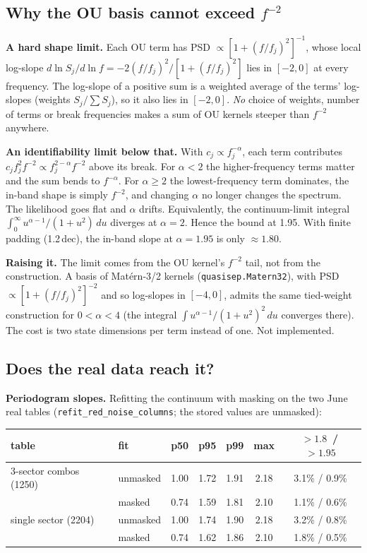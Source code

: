 \documentclass[11pt]{article}
\newcommand{\code}[1]{\texttt{#1}}
\begin{document}
\subsection{Why the OU basis cannot exceed $f^{-2}$}

\textbf{A hard shape limit.} Each OU term has PSD $\propto [1+(f/f_j)^2]^{-1}$, whose
local log-slope $d\ln S_j/d\ln f = -2(f/f_j)^2/[1+(f/f_j)^2]$ lies in $[-2, 0]$ at every
frequency. The log-slope of a positive sum is a weighted average of the terms' log-slopes
(weights $S_j/\sum S_j$), so it also lies in $[-2,0]$. \emph{No} choice of weights, number
of terms or break frequencies makes a sum of OU kernels steeper than $f^{-2}$ anywhere.

\textbf{An identifiability limit below that.} With $c_j\propto f_j^{-\alpha}$, each term
contributes $c_j f_j^2 f^{-2} \propto f_j^{2-\alpha} f^{-2}$ above its break. For
$\alpha<2$ the higher-frequency terms matter and the sum bends to $f^{-\alpha}$. For
$\alpha\ge 2$ the lowest-frequency term dominates, the in-band shape is simply $f^{-2}$,
and changing $\alpha$ no longer changes the spectrum. The likelihood goes flat and
$\alpha$ drifts. Equivalently, the continuum-limit integral
$\int_0^\infty u^{\alpha-1}/(1+u^2)\,du$ diverges at $\alpha=2$. Hence the bound at 1.95.
With finite padding (1.2\,dec), the in-band slope at $\alpha=1.95$ is only $\approx 1.80$.

\textbf{Raising it.} The limit comes from the OU kernel's $f^{-2}$ tail, not from the
construction. A basis of Mat\'ern-3/2 kernels (\code{quasisep.Matern32}), with PSD
$\propto[1+(f/f_j)^2]^{-2}$ and so log-slopes in $[-4,0]$, admits the same tied-weight
construction for $0<\alpha<4$ (the integral $\int u^{\alpha-1}/(1+u^2)^2\,du$ converges
there). The cost is two state dimensions per term instead of one. Not implemented.

\subsection{Does the real data reach it?}

\textbf{Periodogram slopes.} Refitting the continuum with masking on the two June real
tables (\code{refit\_red\_noise\_columns}; the stored values are unmasked):

\begin{center}
\begin{tabular}{llccccc}
\toprule
table & fit & p50 & p95 & p99 & max & $>1.8$ \,/\, $>1.95$ \\
\midrule
3-sector combos (1250) & unmasked & 1.00 & 1.72 & 1.91 & 2.18 & 3.1\% / 0.9\% \\
                       & masked   & 0.74 & 1.59 & 1.81 & 2.10 & 1.1\% / 0.6\% \\
single sector (2204)   & unmasked & 1.00 & 1.74 & 1.90 & 2.18 & 3.2\% / 0.8\% \\
                       & masked   & 0.74 & 1.62 & 1.86 & 2.10 & 1.8\% / 0.5\% \\
\bottomrule
\end{tabular}
\end{center}
\end{document}
